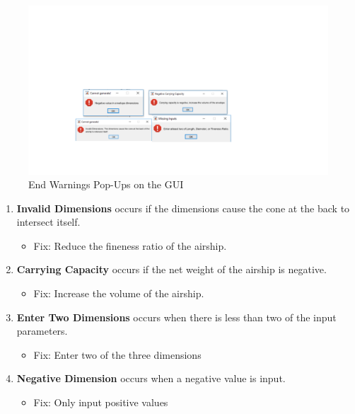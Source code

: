 \documentclass[../main.tex]{subfiles}
\begin{document}
\begin{figure}[H]
	\centering
	\includegraphics[width=0.8\linewidth]{img/gui/errors.pdf}
	\caption{End Warnings Pop-Ups on the GUI}
	\label{fig:errors}
\end{figure}
\begin{enumerate}
	\item \textbf{Invalid Dimensions} occurs if the dimensions cause the cone at the back to intersect itself.
	\begin{itemize}
		\item Fix: Reduce the fineness ratio of the airship.
	\end{itemize}
	\item \textbf{Carrying Capacity} occurs if the net weight of the airship is negative.
	\begin{itemize}
		\item Fix: Increase the volume of the airship.
	\end{itemize} 
	\item \textbf{Enter Two Dimensions} occurs when there is less than two of the input parameters.
	\begin{itemize}
		\item Fix: Enter two of the three dimensions
	\end{itemize} 
	\item \textbf{Negative Dimension} occurs when a negative value is input.
	\begin{itemize}
		\item Fix: Only input positive values
	\end{itemize} 
\end{enumerate}

\pagebreak
\end{document}
